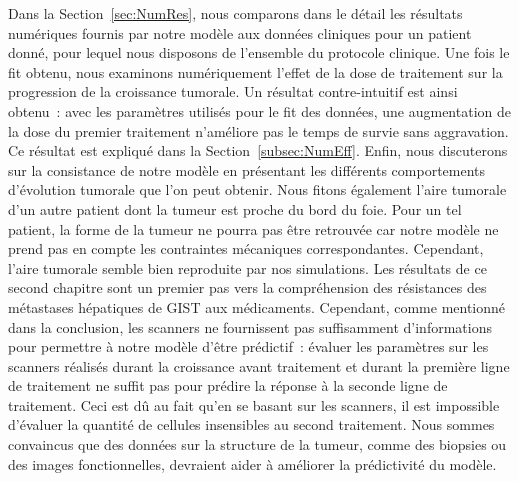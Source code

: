 \documentclass[main.tex]{subfiles}
\begin{document}

Dans la Section~\ref{sec:NumRes}, nous comparons dans le détail les résultats numériques fournis par notre modèle aux données cliniques pour un patient donné, pour lequel nous disposons de l'ensemble du protocole clinique. 
Une fois le fit obtenu, nous examinons numériquement l'effet de la dose de traitement sur la progression de la croissance tumorale. Un résultat contre-intuitif est ainsi obtenu~: avec les paramètres utilisés pour le fit des données, une augmentation de la dose du premier traitement n'améliore pas le temps de survie sans aggravation. Ce résultat est expliqué dans la Section~\ref{subsec:NumEff}. 
Enfin, nous discuterons sur la consistance de notre modèle en présentant les différents comportements d'évolution tumorale que l'on peut obtenir. 
Nous fitons également l'aire tumorale d'un autre patient dont la tumeur est proche du bord du foie. 
Pour un tel patient, la forme de la tumeur ne pourra pas être retrouvée car notre modèle ne prend pas en compte les contraintes mécaniques correspondantes. Cependant, l'aire tumorale semble bien reproduite par nos simulations. 
Les résultats de ce second chapitre sont un premier pas vers la compréhension des résistances des métastases hépatiques de GIST aux médicaments. Cependant, comme mentionné dans la conclusion, les scanners ne fournissent pas suffisamment d'informations pour permettre à notre modèle d'être prédictif~: évaluer les paramètres sur les scanners réalisés durant la croissance avant traitement et durant la première ligne de traitement ne suffit pas pour prédire la réponse à la seconde ligne de traitement. Ceci est dû au fait qu'en se basant sur les scanners, il est impossible d'évaluer la quantité de cellules insensibles au second traitement. Nous sommes convaincus que des données sur la structure de la tumeur, comme des biopsies ou des images fonctionnelles, devraient aider à améliorer la prédictivité du modèle.
\end{document}
